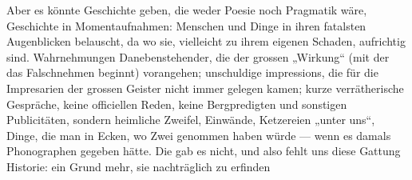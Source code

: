 Aber es könnte Geschichte geben, die weder Poesie noch Pragmatik wäre, Geschichte in Momentaufnahmen: Menschen und Dinge in ihren fatalsten Augenblicken belauscht, da wo sie, vielleicht zu ihrem eigenen Schaden, aufrichtig sind. Wahrnehmungen Danebenstehender, die der grossen „Wirkung“ (mit der das Falschnehmen beginnt) vorangehen; unschuldige impressions, die für die Impresarien der grossen Geister nicht immer gelegen kamen; kurze verrätherische Gespräche, keine officiellen Reden, keine Bergpredigten und sonstigen Publicitäten, sondern heimliche Zweifel, Einwände, Ketzereien „unter uns“, Dinge, die man in Ecken, wo Zwei genommen haben würde — wenn es damals Phonographen gegeben hätte. Die gab es nicht, und also fehlt uns diese Gattung Historie: ein Grund mehr, sie nachträglich zu erfinden 
\par

